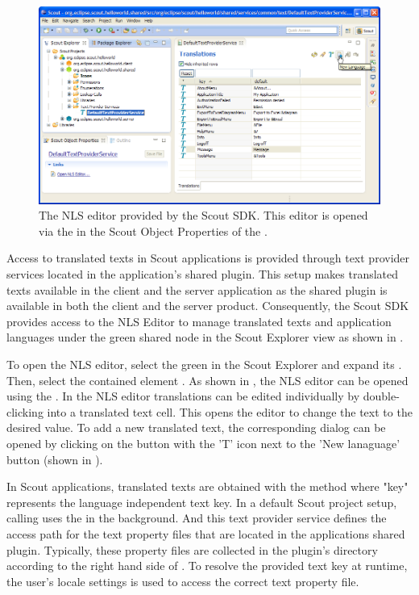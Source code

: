 \documentclass[a4paper,10pt,twoside]{book}
\begin{document}
\begin{figure}
\includegraphics[width=14cm]{sdk_nls_editor.png} 
\caption{The NLS editor provided by the Scout SDK. This editor is opened via the  in the Scout Object Properties of the .
}
\end{figure}

Access to translated texts in Scout applications is provided through text provider services located in the application's shared plugin. 
This setup makes translated texts available in the client and the server application as the shared plugin is available in both the client and the server product. 
Consequently, the Scout SDK provides access to the NLS Editor to manage translated texts and application languages under the green shared node in the Scout Explorer view as shown in .

To open the NLS editor, select the green  in the Scout Explorer and expand its .
Then, select the contained element .
As shown in , the NLS editor can be opened using the .
In the NLS editor translations can be edited individually by double-clicking into a translated text cell.
This opens the editor to change the text to the desired value.
To add a new translated text, the corresponding dialog can be opened by clicking on the button with the 'T' icon next to the 'New lanaguage' button (shown in ).

In Scout applications, translated texts are obtained with the method  where "key" represents the language independent text key.
In a default Scout project setup, calling  uses the  in the background.
And this text provider service defines the access path for the text property files that are located in the applications shared plugin.
Typically, these property files are collected in the plugin's  directory according to the right hand side of . 
To resolve the provided text key at runtime, the user's locale settings is used to access the correct text property file.
\end{document}
